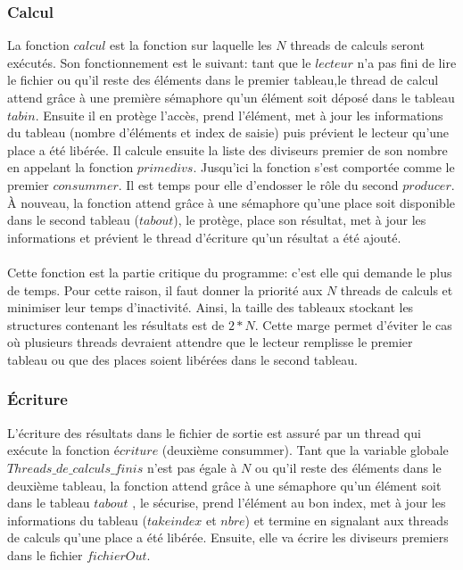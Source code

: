 \documentclass{article}
\begin{document}
\subsubsection{Calcul}
La fonction $calcul$ est la fonction sur laquelle les $N$ threads de calculs seront exécutés. Son fonctionnement est le suivant: tant que le $lecteur$ n'a pas fini de lire le fichier ou qu'il reste des éléments dans le premier tableau,le thread de calcul attend grâce à une première sémaphore qu'un élément soit déposé dans le tableau $tabin$. Ensuite il en protège l'accès, prend l'élément, met à jour les informations du tableau (nombre d'éléments et index de saisie) puis prévient le lecteur qu'une place a été libérée. Il calcule ensuite la liste des diviseurs premier de son nombre en appelant la fonction $primedivs$. Jusqu'ici la fonction s'est comportée comme le premier $consummer$. Il est temps pour elle d'endosser le rôle du second $producer$. À nouveau, la fonction attend grâce à une sémaphore qu'une place soit disponible dans le second tableau ($tabout$), le protège, place son résultat, met à jour les informations et prévient le thread d'écriture qu'un résultat a été ajouté.\\
\\ \danger
Cette fonction est la partie critique du programme: c'est elle qui demande le plus de temps. Pour cette raison, il faut donner la priorité aux $N$ threads de calculs et minimiser leur temps d'inactivité. Ainsi, la taille des tableaux stockant les structures contenant les résultats est de $2*N$. Cette marge permet d'éviter le cas où plusieurs threads devraient attendre que le lecteur remplisse le premier tableau ou que des places soient libérées dans le second tableau.

\subsubsection{Écriture}
L'écriture des résultats dans le fichier de sortie est assuré par un thread qui exécute la fonction $écriture$ (deuxième consummer). Tant que la variable globale $Threads\_de\_calculs\_finis$ n'est pas égale à $N$ ou qu'il reste des éléments dans le deuxième tableau, la fonction attend grâce à une sémaphore qu'un élément soit dans le tableau $tabout$ , le sécurise, prend l'élément au bon index, met à jour les informations du tableau ($takeindex$ et $nbre$) et termine en signalant aux threads de calculs qu'une place a été libérée. Ensuite, elle va écrire les diviseurs premiers dans le fichier $fichierOut$.
\end{document}

